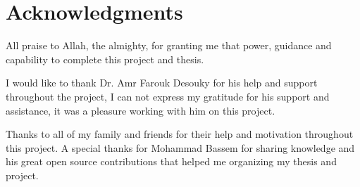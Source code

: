 \chapter*{Acknowledgments}
\label{chap:ack}
All praise to Allah, the almighty, for granting me that power, guidance and capability to complete this project and thesis.

\newParagraph
I would like to thank Dr. Amr Farouk Desouky for his help and support throughout the project, I can not express my
gratitude for his support and assistance, it was a pleasure working with him on this project.

\newParagraph
Thanks to all of my family and friends for their help and motivation throughout this project. A special thanks for Mohammad Bassem for sharing
knowledge and his great open source contributions that helped me organizing my thesis and project.
